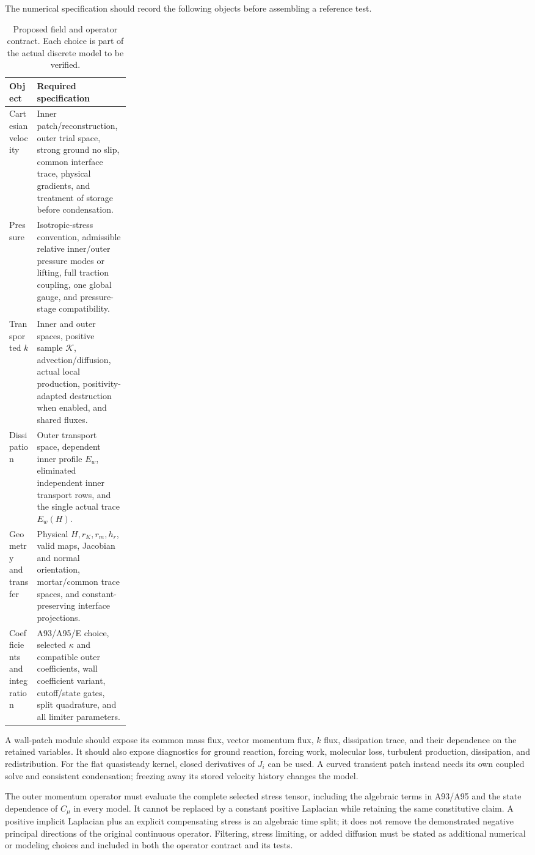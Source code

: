 \documentclass[11pt,a4paper]{article}
\numberwithin{equation}{section}
\begin{document}
The numerical specification should record the following objects
before assembling a reference test.
\begin{table}[htbp]
\centering\small
\caption{Proposed field and operator contract.  Each choice is part
of the actual discrete model to be verified.}
\label{num:assembly-contract}
\begin{tabularx}{\linewidth}{@{}p{0.23\linewidth}X@{}}
\toprule
Object & Required specification\\
\midrule
Cartesian velocity & Inner patch/reconstruction, outer trial space,
strong ground no slip, common interface trace, physical gradients,
and treatment of storage before condensation.\\
Pressure & Isotropic-stress convention, admissible relative
inner/outer pressure modes or lifting, full traction coupling,
one global gauge, and pressure-stage compatibility.\\
Transported $k$ & Inner and outer spaces, positive sample
$\mathcal K$, advection/diffusion, actual local production,
positivity-adapted destruction when enabled, and shared fluxes.\\
Dissipation & Outer transport space, dependent inner profile $E_w$,
eliminated independent inner transport rows, and the single
actual trace $E_w(H)$.\\
Geometry and transfer & Physical $H,r_K,r_m,h_r$, valid maps,
Jacobian and normal orientation, mortar/common trace spaces,
and constant-preserving interface projections.\\
Coefficients and integration & A93/A95/E choice, selected $\kappa$
and compatible outer coefficients, wall coefficient variant,
cutoff/state gates, split quadrature, and all limiter parameters.\\
\bottomrule
\end{tabularx}
\end{table}

A wall-patch module should expose its common mass flux, vector
momentum flux, $k$ flux, dissipation trace, and their dependence on
the retained variables.  It should also expose diagnostics for
ground reaction, forcing work, molecular loss, turbulent production,
dissipation, and redistribution.  For the flat quasisteady kernel,
closed derivatives of $J_i$ can be used.  A curved transient patch
instead needs its own coupled solve and consistent condensation;
freezing away its stored velocity history changes the model.

The outer momentum operator must evaluate the complete selected
stress tensor, including the algebraic terms in A93/A95 and the
state dependence of $C_\mu$ in every model.  It cannot be replaced
by a constant positive Laplacian while retaining the same
constitutive claim.  A positive implicit Laplacian plus an explicit
compensating stress is an algebraic time split; it does not remove
the demonstrated negative principal directions of the original
continuous operator.  Filtering, stress limiting, or added diffusion
must be stated as additional numerical or modeling choices and
included in both the operator contract and its tests.
\end{document}
